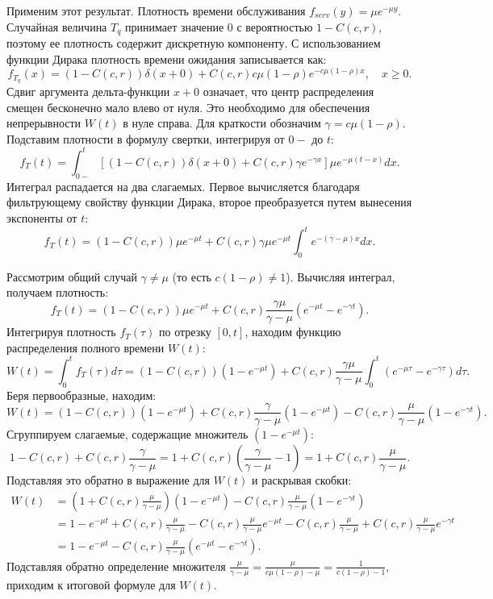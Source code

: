 \begin{sproof}
Применим этот результат. Плотность времени обслуживания $f_{serv}(y) = \mu e^{-\mu y}$. Случайная величина $T_q$ принимает значение 0 с вероятностью $1 - C(c, r)$, поэтому ее плотность содержит дискретную компоненту. С использованием функции Дирака плотность времени ожидания записывается как:
$$
f_{T_q}(x) = (1 - C(c, r))\delta(x+0) + C(c, r) c\mu(1-\rho) e^{-c\mu(1-\rho)x}, \quad x \ge 0.
$$
Сдвиг аргумента дельта-функции $x+0$ означает, что центр распределения смещен бесконечно мало влево от нуля. Это необходимо для обеспечения непрерывности $W(t)$ в нуле справа. Для краткости обозначим $\gamma = c\mu(1-\rho)$. Подставим плотности в формулу свертки, интегрируя от $0-$ до $t$:
$$
f_T(t) = \int_{0-}^t \left[ (1 - C(c, r))\delta(x+0) + C(c, r) \gamma e^{-\gamma x} \right] \mu e^{-\mu(t-x)} dx.
$$
Интеграл распадается на два слагаемых. Первое вычисляется благодаря фильтрующему свойству функции Дирака, второе преобразуется путем вынесения экспоненты от $t$:
$$
f_T(t) = (1 - C(c, r))\mu e^{-\mu t} + C(c, r) \gamma \mu e^{-\mu t} \int_0^t e^{-(\gamma - \mu)x} dx.
$$

Рассмотрим общий случай $\gamma \neq \mu$ (то есть $c(1-\rho) \neq 1$). Вычисляя интеграл, получаем плотность:
$$
f_T(t) = (1 - C(c, r))\mu e^{-\mu t} + C(c, r) \frac{\gamma \mu}{\gamma - \mu} \left( e^{-\mu t} - e^{-\gamma t} \right).
$$
Интегрируя плотность $f_T(\tau)$ по отрезку $[0, t]$, находим функцию распределения полного времени $W(t)$:
$$
W(t) = \int_0^t f_T(\tau) d\tau = (1 - C(c, r))(1 - e^{-\mu t}) + C(c, r) \frac{\gamma \mu}{\gamma - \mu} \int_0^t \left( e^{-\mu \tau} - e^{-\gamma \tau} \right) d\tau.
$$
Беря первообразные, находим:
$$
W(t) = (1 - C(c, r))(1 - e^{-\mu t}) + C(c, r) \frac{\gamma}{\gamma - \mu} (1 - e^{-\mu t}) - C(c, r) \frac{\mu}{\gamma - \mu} (1 - e^{-\gamma t}).
$$
Сгруппируем слагаемые, содержащие множитель $(1 - e^{-\mu t})$:
$$
1 - C(c, r) + C(c, r) \frac{\gamma}{\gamma - \mu} = 1 + C(c, r) \left( \frac{\gamma}{\gamma - \mu} - 1 \right) = 1 + C(c, r) \frac{\mu}{\gamma - \mu}.
$$
Подставляя это обратно в выражение для $W(t)$ и раскрывая скобки:
\begin{align*}
    W(t) &= \left( 1 + C(c, r) \frac{\mu}{\gamma - \mu} \right) (1 - e^{-\mu t}) - C(c, r) \frac{\mu}{\gamma - \mu} (1 - e^{-\gamma t}) \\[2mm]
    &= 1 - e^{-\mu t} + C(c, r) \frac{\mu}{\gamma - \mu} - C(c, r) \frac{\mu}{\gamma - \mu} e^{-\mu t} - C(c, r) \frac{\mu}{\gamma - \mu} + C(c, r) \frac{\mu}{\gamma - \mu} e^{-\gamma t} \\[2mm]
    &= 1 - e^{-\mu t} - C(c, r) \frac{\mu}{\gamma - \mu} \left( e^{-\mu t} - e^{-\gamma t} \right).
\end{align*}
Подставляя обратно определение множителя $\frac{\mu}{\gamma - \mu} = \frac{\mu}{c\mu(1-\rho) - \mu} = \frac{1}{c(1-\rho) - 1}$, приходим к итоговой формуле для $W(t)$.


\end{sproof}
